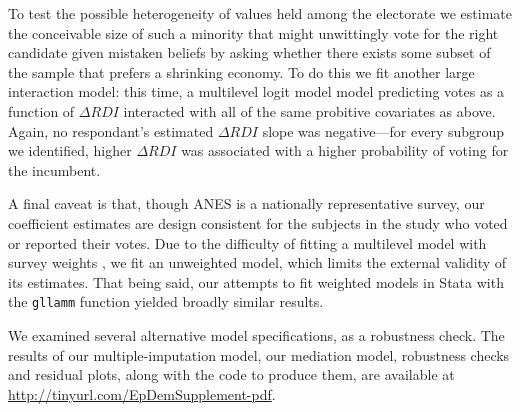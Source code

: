 \documentclass[11pt]{article}
\begin{document}
To test the possible heterogeneity of values held among the electorate we estimate the conceivable size of such a minority that might unwittingly vote for the right candidate given mistaken beliefs by asking whether there exists some subset of the sample that prefers a shrinking economy. %
To do this we fit another large interaction model: this time, a
multilevel logit model model predicting votes as a function of $\Delta
RDI$ interacted with all of the same probitive covariates as above.
Again, no respondant's estimated $\Delta RDI$ slope was negative---for
every subgroup we identified, higher $\Delta RDI$ was associated with
a higher probability of voting for the incumbent.

\begin{comment}
Though we argue that RDI's lack of significance when prospective and retrospective variables are included in the model is not a problem, we must admit that this informal path analysis \citep{baron1986moderator} should be taken with a grain of salt.
In particular; \citet{imai2010identification} has shown that the path analysis estimators of indirect and direct effects rely upon sequential ignorability.
Among other things, this implies that, conditioning on the other variables in the model, the relationship between subjects' perceptions of the economy and their votes are unconfounded.
This would be violated if, say, a different macroeconomic indicator, such as unemployment, predicted both subjects' perceptions of the economy and RDI.
Nevertheless, it is hard to see how RDI would affect voters' choices other than by affecting their perceptions of the macroeconomy, and these results support that intuition.
\end{comment}

A final caveat is that, though ANES is a nationally representative survey, our coefficient estimates are design consistent for the subjects in the study who voted or reported their votes.
Due to the difficulty of fitting a multilevel model with survey weights \citep{gelman2007struggles}, we fit an unweighted model, which limits the external validity of its estimates.
That being said, our attempts to fit weighted models in Stata \citep{stata} with the \verb|gllamm| function \citep{gllamm} yielded broadly similar results.

We examined several alternative model specifications, as a robustness check.
The results of %
our multiple-imputation model, our mediation model, robustness checks and residual plots, along with the code to produce them, are available at \url{http://tinyurl.com/EpDemSupplement-pdf}.
\end{document}
